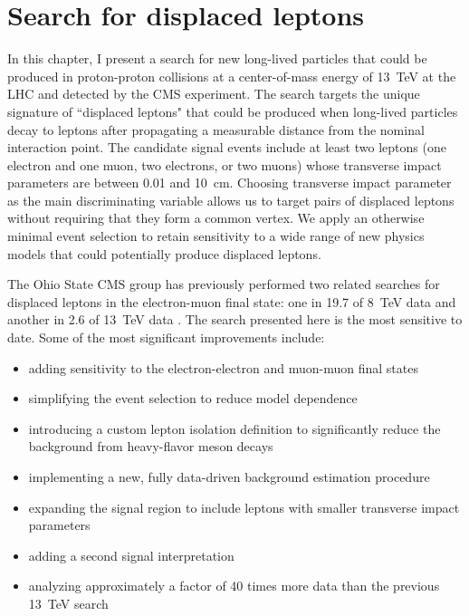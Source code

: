 \chapter{Search for displaced leptons}
\label{displaced_leptons}
In this chapter, I present a search for new long-lived particles that could be produced in proton-proton collisions at a center-of-mass energy of \SI{13}{\TeV} at the LHC and detected by the CMS experiment. The search targets the unique signature of ``displaced leptons" that could be produced when long-lived particles decay to leptons after propagating a measurable distance from the nominal interaction point. The candidate signal events include at least two leptons (one electron and one muon, two electrons, or two muons) whose transverse impact parameters are between \num{0.01} and \SI{10}{\cm}. Choosing transverse impact parameter as the main discriminating variable allows us to target pairs of displaced leptons without requiring that they form a common vertex. We apply an otherwise minimal event selection to retain sensitivity to a wide range of new physics models that could potentially produce displaced leptons.

The Ohio State CMS group has previously performed two related searches for displaced leptons in the electron-muon final state: one in \SI{19.7}{\fb} of \SI{8}{\TeV} data and another in \SI{2.6}{\fb} of \SI{13}{\TeV} data \cite{displaced_leptons_run1, displaced_leptons_bing}. The search presented here is the most sensitive to date. Some of the most significant improvements include:
\begin{itemize}
    \itemsep0em
    \item adding sensitivity to the electron-electron and muon-muon final states
    \item simplifying the event selection to reduce model dependence
    \item introducing a custom lepton isolation definition to significantly reduce the background from heavy-flavor meson decays
    \item implementing a new, fully data-driven background estimation procedure
    \item expanding the signal region to include leptons with smaller transverse impact parameters
    \item adding a second signal interpretation
    \item analyzing approximately a factor of \num{40} times more data than the previous \SI{13}{\TeV} search \cite{displaced_leptons_bing}
\end{itemize}

